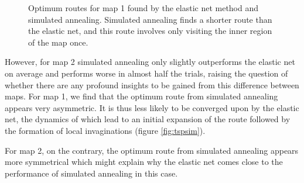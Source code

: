 \documentclass{article}
\begin{document}
\begin{figure}[h]
\begin{subfigure}[t]{0.28\linewidth}
		\label{fig:comp1an}	
	\end{subfigure}%
\caption{Optimum routes for map 1 found by the elastic net method and simulated annealing. Simulated annealing finds a shorter route than the elastic net, and this route involves only visiting the inner region of the map once. }
\label{fig:comp1}
\end{figure}

However, for map 2 simulated annealing only slightly outperforms the elastic net on average and performs worse in almost half the trials, raising the question of whether there are any profound insights to be gained from this difference between maps. For map 1, we find that the optimum route from simulated annealing appears very asymmetric. It is thus less likely to be converged upon by the elastic net, the dynamics of which lead to an initial expansion of the route followed by the formation of local invaginations (figure \ref{fig:tspsim}).

For map 2, on the contrary, the optimum route from simulated annealing appears more symmetrical which might explain why the elastic net comes close to the performance of simulated annealing in this case.
\end{document}

